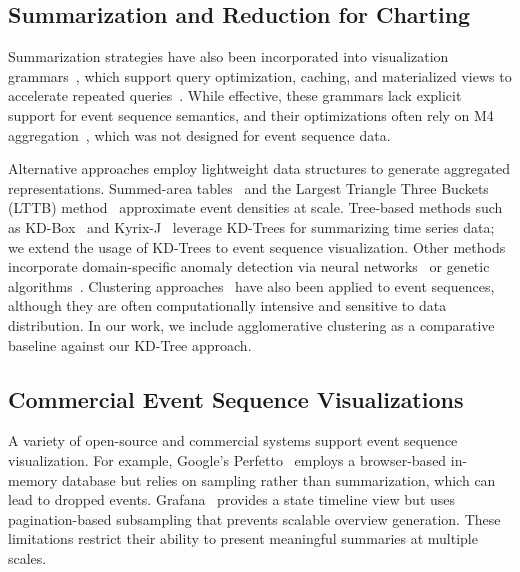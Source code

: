 \begin{refsection}
\subsection{Summarization and Reduction for Charting}

\begin{sloppypar}
Summarization strategies have also been incorporated into visualization grammars~\cite{satyanarayan2016vega, heer2023mosaic, mcnutt2022no}, which support query optimization, caching, and materialized views to accelerate repeated queries~\cite{battle2020structured}. While effective, these grammars lack explicit support for event sequence semantics, and their optimizations often rely on M4 aggregation~\cite{jugel2014m4}, which was not designed for event sequence data.

Alternative approaches employ lightweight data structures to generate aggregated representations. Summed-area tables~\cite{sakin2022traveler} and the Largest Triangle Three Buckets (LTTB) method~\cite{van2022plotly} approximate event densities at scale. Tree-based methods such as KD-Box~\cite{zhao2021kd} and Kyrix-J~\cite{tao2020kyrix} leverage KD-Trees for summarizing time series data; we extend the usage of KD-Trees to event sequence visualization. Other methods incorporate domain-specific anomaly detection via neural networks~\cite{yeshchenko2021visual, tao2022kyrix, krawczuk2021anomaly} or genetic algorithms~\cite{jo2014livegantt}. Clustering approaches~\cite{nesi2023summarizing, isaacs2014combing, pasupathi2021trend} have also been applied to event sequences, although they are often computationally intensive and sensitive to data distribution. In our work, we include agglomerative clustering as a comparative baseline against our KD-Tree approach.
\end{sloppypar}

\subsection{Commercial Event Sequence Visualizations}
A variety of open-source and commercial systems support event sequence visualization. For example, Google's Perfetto~\cite{Perfetto} employs a browser-based in-memory database but relies on sampling rather than summarization, which can lead to dropped events. Grafana~\cite{grafana} provides a state timeline view but uses pagination-based subsampling that prevents scalable overview generation. These limitations restrict their ability to present meaningful summaries at multiple scales.


\end{refsection}
